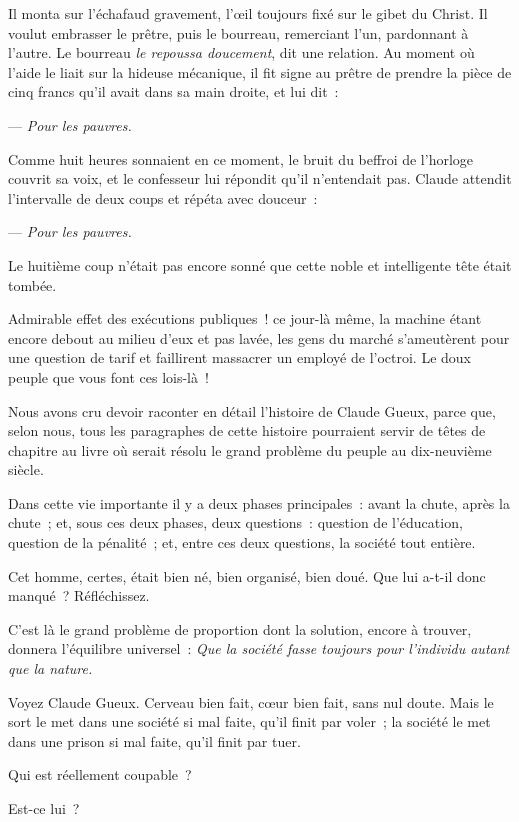 \documentclass[french,twoside]{book} %
\begin{document}
Il monta sur l’échafaud gravement, l’œil toujours fixé sur le gibet du Christ. Il voulut embrasser le prêtre, puis le bourreau, remerciant l’un, pardonnant à l’autre. Le bourreau \emph{le repoussa doucement}, dit une relation. Au moment où l’aide le liait sur la hideuse mécanique, il fit signe au prêtre de prendre la pièce de cinq francs qu’il avait dans sa main droite, et lui dit :\par
— \emph{Pour les pauvres.}\par
Comme huit heures sonnaient en ce moment, le bruit du beffroi de l’horloge couvrit sa voix, et le confesseur lui répondit qu’il n’entendait pas. Claude attendit l’intervalle de deux coups et répéta avec douceur :\par
— \emph{Pour les pauvres.}\par
Le huitième coup n’était pas encore sonné que cette noble et intelligente tête était tombée.\par
Admirable effet des exécutions publiques ! ce jour-là même, la machine étant encore debout au milieu d’eux et pas lavée, les gens du marché s’ameutèrent pour une question de tarif et faillirent massacrer un employé de l’octroi. Le doux peuple que vous font ces lois-là !\par
Nous avons cru devoir raconter en détail l’histoire de Claude Gueux, parce que, selon nous, tous les paragraphes de cette histoire pourraient servir de têtes de chapitre au livre où serait résolu le grand problème du peuple au dix-neuvième siècle.\par
 Dans cette vie importante il y a deux phases principales : avant la chute, après la chute ; et, sous ces deux phases, deux questions : question de l’éducation, question de la pénalité ; et, entre ces deux questions, la société tout entière.\par
Cet homme, certes, était bien né, bien organisé, bien doué. Que lui a-t-il donc manqué ? Réfléchissez.\par
C’est là le grand problème de proportion dont la solution, encore à trouver, donnera l’équilibre universel : \emph{Que la société fasse toujours pour l’individu autant que la nature.}\par
Voyez Claude Gueux. Cerveau bien fait, cœur bien fait, sans nul doute. Mais le sort le met dans une société si mal faite, qu’il finit par voler ; la société le met dans une prison si mal faite, qu’il finit par tuer.\par
Qui est réellement coupable ?\par
Est-ce lui ?\par
\end{document}
